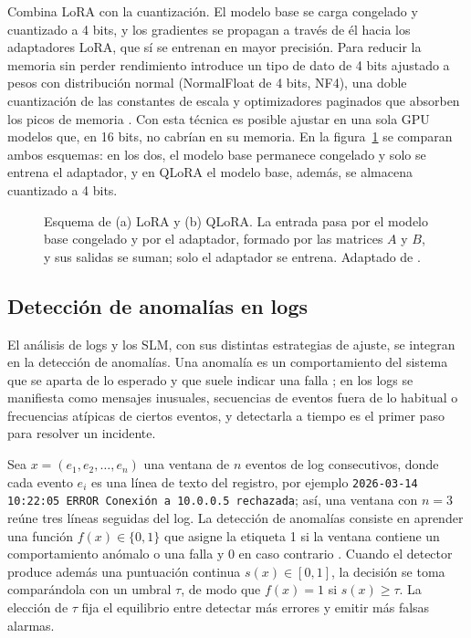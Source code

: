 
Combina LoRA con la cuantización. El modelo base se carga congelado y cuantizado a 4 bits, y los gradientes se propagan a través de él hacia los adaptadores LoRA, que sí se entrenan en mayor precisión. Para reducir la memoria sin perder rendimiento introduce un tipo de dato de 4 bits ajustado a pesos con distribución normal (NormalFloat de 4 bits, NF4), una doble cuantización de las constantes de escala y optimizadores paginados que absorben los picos de memoria \cite{dettmers2023_qlora}. Con esta técnica es posible ajustar en una sola GPU modelos que, en 16 bits, no cabrían en su memoria. En la figura~\ref{fig:ant_lora} se comparan ambos esquemas: en los dos, el modelo base permanece congelado y solo se entrena el adaptador, y en QLoRA el modelo base, además, se almacena cuantizado a 4 bits.

\begin{figure}[H]
\centering

\caption[Esquema de (a) LoRA y (b) QLoRA.]{Esquema de (a) LoRA y (b) QLoRA. La entrada pasa por el modelo base congelado y por el adaptador, formado por las matrices $A$ y $B$, y sus salidas se suman; solo el adaptador se entrena. Adaptado de \cite{hu2022_lora}.}
\label{fig:ant_lora}
\end{figure}

\subsection{Detección de anomalías en logs}\label{sec:mt_anomalias}


El análisis de logs y los SLM, con sus distintas estrategias de ajuste, se integran en la detección de anomalías. Una anomalía es un comportamiento del sistema que se aparta de lo esperado y que suele indicar una falla \cite{he2021_survey}; en los logs se manifiesta como mensajes inusuales, secuencias de eventos fuera de lo habitual o frecuencias atípicas de ciertos eventos, y detectarla a tiempo es el primer paso para resolver un incidente.


Sea $x = (e_1, e_2, \ldots, e_n)$ una ventana de $n$ eventos de log consecutivos, donde cada evento $e_i$ es una línea de texto del registro, por ejemplo \texttt{2026-03-14 10:22:05 ERROR Conexión a 10.0.0.5 rechazada}; así, una ventana con $n = 3$ reúne tres líneas seguidas del log. La detección de anomalías consiste en aprender una función $f(x) \in \{0, 1\}$ que asigne la etiqueta 1 si la ventana contiene un comportamiento anómalo o una falla y 0 en caso contrario \cite{he2021_survey}. Cuando el detector produce además una puntuación continua $s(x) \in [0, 1]$, la decisión se toma comparándola con un umbral $\tau$, de modo que $f(x) = 1$ si $s(x) \geq \tau$. La elección de $\tau$ fija el equilibrio entre detectar más errores y emitir más falsas alarmas.

